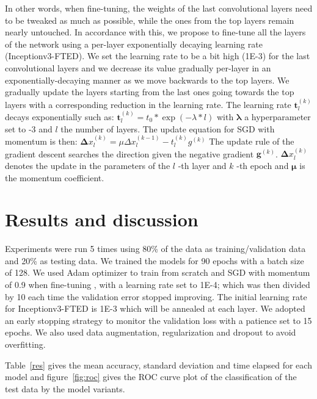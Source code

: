 \documentclass{article}
\begin{document}
In other words, when fine-tuning, the weights of the last convolutional layers need to be tweaked as much as possible, while the ones from the top layers remain nearly untouched. 
In accordance with this, we propose to fine-tune all the layers of the network using a per-layer exponentially decaying learning rate  \citep{walter1990nonlinear} (Inceptionv3-FTED).
We set the learning rate to be a bit high (1E-3) for the last convolutional layers and we decrease its value gradually per-layer in an exponentially-decaying manner as we move backwards to the top layers. 
We gradually update the layers starting from the last ones going towards the top layers with a corresponding reduction in the learning rate.
The learning rate $\mathbf t_{l}^{(k)} $ decays exponentially such as:
$\mathbf t_{l}^{(k)}= t_{0} \ast \exp (-\lambda \ast l)$ with $\mathbf \lambda $ a hyperparameter set to -3 and $\mathit{l}$ the number of layers. The update equation for SGD with momentum is then: $\mathbf \Delta x_{l}^{(k)}= \mu \Delta x_{l}^{(k-1)}-t_{l}^{(k)} g^{(k)} $ 
The update rule of the gradient descent searches the direction given the negative gradient $\mathbf g^{(k)} $. $\mathbf \Delta x_{l}^{(k)} $ denotes the update in the parameters of the $\mathit{l}$ -th layer and $\mathit{k}$ -th epoch and $\mathbf \mu $ is the momentum coefficient.   

\section{Results and discussion}

Experiments were run 5 times using 80\% of the data as training/validation data and 20\% as testing data. We trained the models for 90 epochs with a batch size of 128. We used Adam optimizer to train from scratch and SGD with momentum of 0.9 when fine-tuning , with a learning rate set to 1E-4; which was then divided by 10 each time the validation error stopped improving. The initial learning rate for Inceptionv3-FTED is 1E-3 which will be annealed at each layer. We adopted an early stopping strategy to monitor the validation loss with a patience set to 15 epochs. We also used data augmentation, regularization and dropout to avoid overfitting. 

Table~\ref{res} gives the mean accuracy, standard deviation and time elapsed for each model and figure~\ref{fig:roc} gives the ROC curve plot of the classification of the test data by the model variants.  
\end{document}

